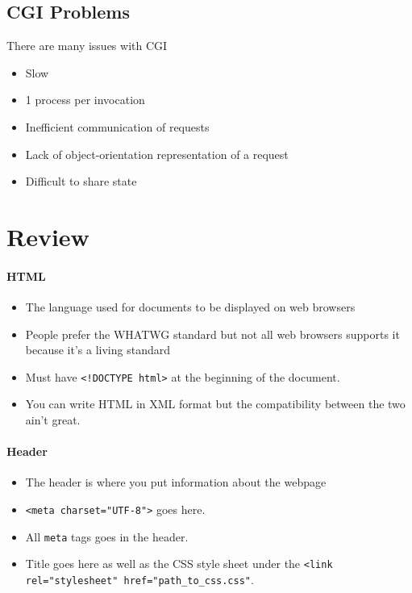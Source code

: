 \documentclass[../CMPUT-404-Notes.tex]{subfiles}
\begin{document}
\subsection{CGI Problems}
There are many issues with CGI
\begin{itemize}
  \item Slow
  \item 1 process per invocation
  \item Inefficient communication of requests
  \item Lack of object-orientation representation of a request
  \item Difficult to share state  
\end{itemize}
\twocolumn

\section{Review}
\paragraph{HTML}
\begin{itemize}
  \item The language used for documents to be displayed on web browsers
  \item People prefer the WHATWG standard but not all web browsers supports it because it's a living standard
  \item Must have \texttt{<!DOCTYPE html>} at the beginning of the document.
  \item You can write HTML in XML format but the compatibility between the two ain't great. 
\end{itemize}
\paragraph{Header}
\begin{itemize}
  \item The header is where you put information about the webpage
  \item \texttt{<meta charset="UTF-8">} goes here.
  \item All \texttt{meta} tags goes in the header.
  \item Title goes here as well as the CSS style sheet under the \texttt{<link rel="stylesheet" href="path_to_css.css"}.
\end{itemize}
\end{document}
